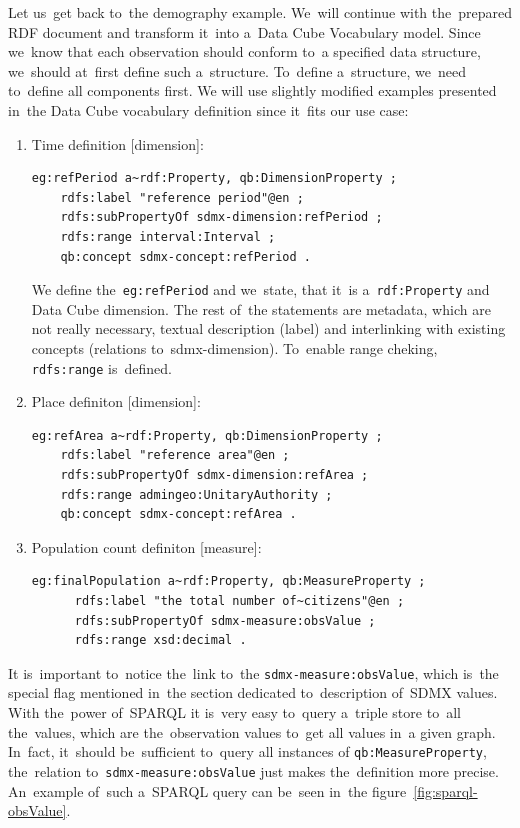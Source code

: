 Let us~get back to~the demography example. We~will continue with the~prepared RDF
document and transform it~into a~Data Cube Vocabulary model. Since we~know that each
observation should conform to~a specified data structure, we~should at~first define
such a~structure. To~define a~structure, we~need to~define all components first.
We will use slightly modified examples presented in~the Data Cube vocabulary
definition since it~fits our use case:

\begin{enumerate}
\item Time definition [dimension]:

\begin{verbatim}
eg:refPeriod a~rdf:Property, qb:DimensionProperty ;
    rdfs:label "reference period"@en ;
    rdfs:subPropertyOf sdmx-dimension:refPeriod ;
    rdfs:range interval:Interval ;
    qb:concept sdmx-concept:refPeriod .
\end{verbatim}

We define the~\texttt{eg:refPeriod} and we~state, that it~is a~\texttt{rdf:Property} and Data Cube dimension.
The rest of~the statements are metadata, which are not really necessary, textual description
(label) and interlinking with existing concepts (relations to~sdmx-dimension). To~enable range
cheking, \texttt{rdfs:range} is~defined.

\item Place definiton [dimension]:

\begin{verbatim}
eg:refArea a~rdf:Property, qb:DimensionProperty ;
    rdfs:label "reference area"@en ;
    rdfs:subPropertyOf sdmx-dimension:refArea ;
    rdfs:range admingeo:UnitaryAuthority ;
    qb:concept sdmx-concept:refArea .
\end{verbatim}

\item Population count definiton [measure]:
\begin{verbatim}
eg:finalPopulation a~rdf:Property, qb:MeasureProperty ;
      rdfs:label "the total number of~citizens"@en ;
      rdfs:subPropertyOf sdmx-measure:obsValue ;
      rdfs:range xsd:decimal .
\end{verbatim}
\end{enumerate}

It is~important to~notice the~link to~the \texttt{sdmx-measure:obsValue}, which is~the special flag
mentioned in~the section dedicated to~description of~SDMX values. With the~power of~SPARQL
it is~very easy to~query a~triple store to~all the~values, which are the~observation values to~get
all values in~a given graph. In~fact, it~should be~sufficient to~query all instances of
\texttt{qb:MeasureProperty}, the~relation to~\texttt{sdmx-measure:obsValue} just makes the~definition
more precise. An~example of~such a~SPARQL query can be~seen in~the 
figure~\ref{fig:sparql-obsValue}.

